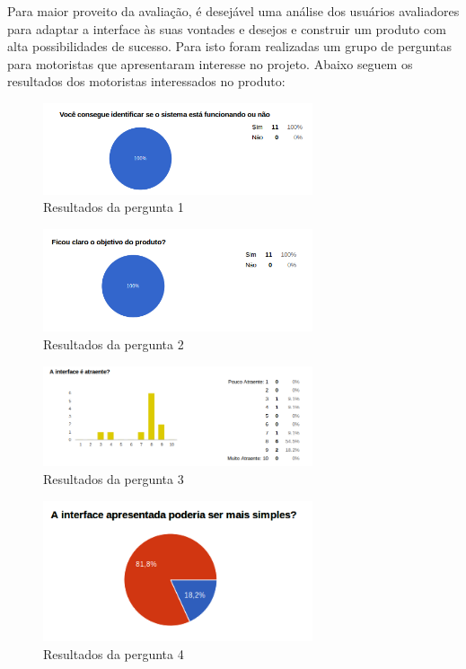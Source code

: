 \begin{itemize}
Para maior proveito da avaliação, é desejável uma análise dos usuários avaliadores para adaptar a interface às suas vontades e desejos e construir um produto com alta possibilidades de sucesso. Para isto foram realizadas um grupo de perguntas para motoristas que apresentaram interesse no projeto. Abaixo seguem os resultados dos motoristas interessados no produto:

\begin{figure}[h]
  \centering
  \includegraphics[width=300px, scale=1]{figuras/result1}
  \caption{Resultados da pergunta 1}
\label{fig:result1}
\end{figure}


\begin{figure}[h]
  \centering
  \includegraphics[width=300px, scale=1]{figuras/result2}
  \caption{Resultados da pergunta 2}
\label{fig:result2}
\end{figure}


\begin{figure}[h]
  \centering
  \includegraphics[width=300px, scale=1]{figuras/result3}
  \caption{Resultados da pergunta 3}
\label{fig:result3}
\end{figure}


\begin{figure}[h]
  \centering
  \includegraphics[width=300px, scale=1]{figuras/result4}
  \caption{Resultados da pergunta 4}
\label{fig:result4}
\end{figure}



\end{itemize}
